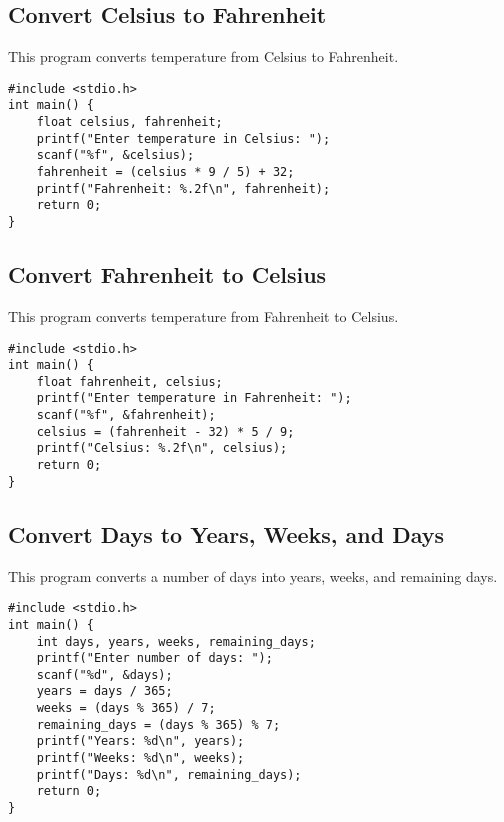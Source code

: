 \documentclass[a4paper,12pt]{article}
\begin{document}
\newpage

\subsection{Convert Celsius to Fahrenheit}
This program converts temperature from Celsius to Fahrenheit.

\begin{lstlisting}[caption={Convert Celsius to Fahrenheit}]
#include <stdio.h>
int main() {
    float celsius, fahrenheit;
    printf("Enter temperature in Celsius: ");
    scanf("%f", &celsius);
    fahrenheit = (celsius * 9 / 5) + 32;
    printf("Fahrenheit: %.2f\n", fahrenheit);
    return 0;
}
\end{lstlisting}

\newpage

\subsection{Convert Fahrenheit to Celsius}
This program converts temperature from Fahrenheit to Celsius.

\begin{lstlisting}[caption={Convert Fahrenheit to Celsius}]
#include <stdio.h>
int main() {
    float fahrenheit, celsius;
    printf("Enter temperature in Fahrenheit: ");
    scanf("%f", &fahrenheit);
    celsius = (fahrenheit - 32) * 5 / 9;
    printf("Celsius: %.2f\n", celsius);
    return 0;
}
\end{lstlisting}

\newpage

\subsection{Convert Days to Years, Weeks, and Days}
This program converts a number of days into years, weeks, and remaining days.

\begin{lstlisting}[caption={Convert Days to Years, Weeks, and Days}]
#include <stdio.h>
int main() {
    int days, years, weeks, remaining_days;
    printf("Enter number of days: ");
    scanf("%d", &days);
    years = days / 365;
    weeks = (days % 365) / 7;
    remaining_days = (days % 365) % 7;
    printf("Years: %d\n", years);
    printf("Weeks: %d\n", weeks);
    printf("Days: %d\n", remaining_days);
    return 0;
}
\end{lstlisting}
\end{document}
